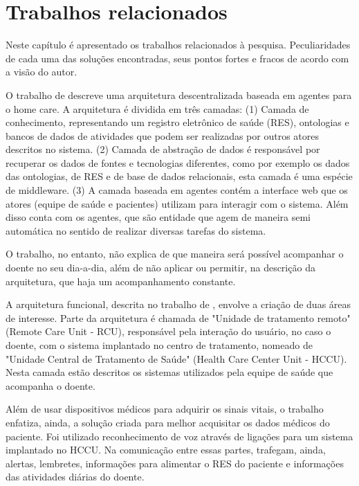 \chapter{Trabalhos relacionados}\label{cap:trabalhos-relacionados}

Neste capítulo é apresentado os trabalhos relacionados à pesquisa. Peculiaridades
de cada uma das soluções encontradas, seus pontos fortes e fracos de acordo com
a visão do autor.

O trabalho de  descreve uma arquitetura
descentralizada baseada em agentes para o home care. A arquitetura é dividida
em três camadas: (1) Camada de conhecimento, representando um registro
eletrônico de saúde (RES), ontologias e bancos de dados de atividades que podem
ser realizadas por outros atores descritos no sistema. (2) Camada de abstração
de dados é responsável por recuperar os dados de fontes e tecnologias
diferentes, como por exemplo os dados das ontologias, de RES e de base de dados
relacionais, esta camada é uma espécie de middleware. (3) A camada baseada em
agentes contém a interface web que os atores (equipe de saúde e pacientes)
utilizam para interagir com o sistema. Além disso conta com os agentes, que são
entidade que agem de maneira semi automática no sentido de realizar diversas
tarefas do sistema. 

O trabalho, no entanto, não explica de que maneira será possível acompanhar o
doente no seu dia-a-dia, além de não aplicar ou permitir, na descrição da
arquitetura, que haja um acompanhamento constante.

A arquitetura funcional, descrita no trabalho de ,
envolve a criação de duas áreas de interesse. Parte da arquitetura é chamada
de "Unidade de tratamento remoto" (Remote Care Unit - RCU), responsável pela
interação do usuário, no caso o doente, com o sistema implantado no centro de
tratamento, nomeado de "Unidade Central de Tratamento de Saúde" (Health Care
Center Unit - HCCU). Nesta camada estão descritos os sistemas utilizados pela
equipe de saúde que acompanha o doente.

Além de usar dispositivos médicos para adquirir os sinais vitais, o trabalho
enfatiza, ainda, a solução criada para melhor acquisitar os dados médicos do
paciente. Foi utilizado reconhecimento de voz através de ligações para um
sistema implantado no HCCU. Na comunicação entre essas partes, trafegam, ainda,
alertas, lembretes, informações para alimentar o RES do paciente e informações
das atividades diárias do doente.


